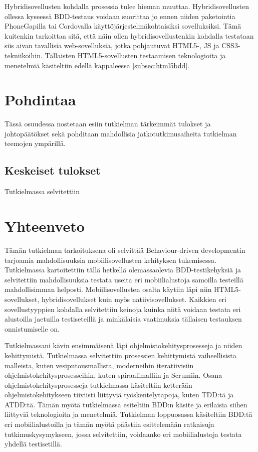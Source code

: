 \documentclass[finnish,nonumbib,nocopyright]{gradu2}
\begin{document}
Hybridisovellusten kohdalla prosessia tulee hieman muuttaa. Hybridisovellusten ollessa kyseessä BDD-testaus voidaan suorittaa jo ennen niiden paketointia PhoneGapilla tai Cordovalla käyttöjärjestelmäkohtaisiksi sovelluksiksi. Tämä kuitenkin tarkoittaa sitä, että näin ollen hybridisovellustenkin kohdalla testataan siis aivan tavallisia web-sovelluksia, jotka pohjautuvat HTML5-, JS ja CSS3-tekniikoihin. Tällaisten HTML5-sovellusten testaamisen teknologioita ja menetelmiä käsiteltiin edellä kappaleessa \ref{subsec:html5bdd}. 
\chapter{Pohdintaa}
Tässä osuudessa nostetaan esiin tutkielman tärkeimmät tulokset ja johtopäätökset sekä pohditaan mahdollisia jatkotutkimusaiheita tutkielman teemojen ympärillä.
\section{Keskeiset tulokset}
Tutkielmassa selvitettiin 
\chapter{Yhteenveto}

Tämän tutkielman tarkoituksena oli selvittää Behaviour-driven developmentin tarjoamia mahdollisuuksia mobiilisovellusten kehityksen tukemisessa. Tutkielmassa kartoitettiin tällä hetkellä olemassaolevia BDD-testikehyksiä ja selvitettiin mahdollisuuksia testata useita eri mobiilialustoja samoilla testeillä mahdollisimman helposti. Mobiilisovellusten osalta käytiin läpi niin HTML5-sovellukset, hybridisovellukset kuin myös natiivisovellukset. Kaikkien eri sovellustyyppien kohdalla selvitettiin keinoja kuinka niitä voidaan testata eri alustoilla jaetuilla testiseteillä ja minkälaisia vaatimuksia tällaisen testauksen onnistumiselle on.

Tutkielmassani kävin ensimmäisenä läpi ohjelmistokehitysprosesseja ja niiden kehittymistä. Tutkielmassa selvitettiin prosessien kehittymistä vaiheellisista malleista, kuten vesiputousmallista, moderneihin iteratiivisiin ohjelmistokehitysprosesseihin, kuten spiraalimalliin ja Scrumiin. Osana ohjelmistokehitysprosesseja tutkielmassa käsiteltiin ketterään ohjelmistokehitykseen tiiviisti liittyviä työskentelytapoja, kuten TDD:tä ja ATDD:tä. Tämän myötä tutkielmassa esiteltiin BDD:n käsite ja erilaisia siihen liittyviä teknologioita ja menetelmiä. Tutkielman loppuosassa käsiteltiin BDD:tä eri mobiilialustoilla ja tämän myötä päästiin esittelemään ratkaisuja tutkimuskysymykseen, jossa selvitettiin, voidaanko eri mobiilialustoja testata yhdellä testisetillä.
\end{document}
